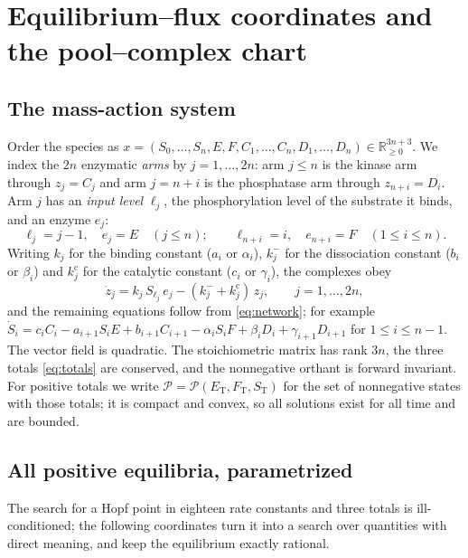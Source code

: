 \documentclass[11pt,a4paper]{article}
\theoremstyle{plain}
\theoremstyle{definition}
\theoremstyle{remark}
\newcommand{\R}{\mathbb R}
\newcommand{\cP}{\mathcal P}
\newcommand{\ET}{E_{\mathrm T}}
\newcommand{\FT}{F_{\mathrm T}}
\newcommand{\ST}{S_{\mathrm T}}
\begin{document}
\section{Equilibrium--flux coordinates and the pool--complex chart}\label{sec:model}

\subsection{The mass-action system}
Order the species as $x=(S_0,\dots,S_n,E,F,C_1,\dots,C_n,D_1,\dots,D_n)\in\R^{3n+3}_{\ge0}$. We index the $2n$ enzymatic \emph{arms} by $j=1,\dots,2n$: arm $j\le n$ is the kinase arm through $z_j=C_j$ and arm $j=n+i$ is the phosphatase arm through $z_{n+i}=D_i$. Arm $j$ has an \emph{input level} $\ell_j$, the phosphorylation level of the substrate it binds, and an enzyme $e_j$:
\[
 \ell_j=j-1,\quad e_j=E\quad(j\le n);\qquad \ell_{n+i}=i,\quad e_{n+i}=F\quad(1\le i\le n).
\]
Writing $k_j$ for the binding constant ($a_i$ or $\alpha_i$), $k_j^{-}$ for the dissociation constant ($b_i$ or $\beta_i$) and $k_j^{\mathrm c}$ for the catalytic constant ($c_i$ or $\gamma_i$), the complexes obey
\begin{equation}\label{eq:complex-ode}
 \dot z_j=k_j\,S_{\ell_j}\,e_j-(k_j^{-}+k_j^{\mathrm c})\,z_j ,\qquad j=1,\dots,2n,
\end{equation}
and the remaining equations follow from \eqref{eq:network}; for example $\dot S_i=c_iC_i-a_{i+1}S_iE+b_{i+1}C_{i+1}-\alpha_iS_iF+\beta_iD_i+\gamma_{i+1}D_{i+1}$ for $1\le i\le n-1$. The vector field is quadratic. The stoichiometric matrix has rank $3n$, the three totals \eqref{eq:totals} are conserved, and the nonnegative orthant is forward invariant. For positive totals we write $\cP=\cP(\ET,\FT,\ST)$ for the set of nonnegative states with those totals; it is compact and convex, so all solutions exist for all time and are bounded.

\subsection{All positive equilibria, parametrized}
The search for a Hopf point in eighteen rate constants and three totals is ill-conditioned; the following coordinates turn it into a search over quantities with direct meaning, and keep the equilibrium exactly rational.
\end{document}
